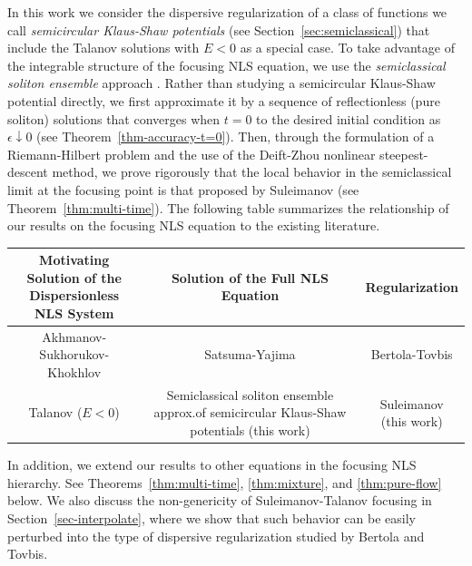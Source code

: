 \documentclass[12pt]{amsart}
\numberwithin{equation}{section}
\begin{document}
In this work we consider the dispersive regularization of a class of 
functions we call \emph{semicircular Klaus-Shaw potentials} (see 
Section~\ref{sec:semiclassical}) that include the Talanov solutions with $E<0$ as 
a special case.  To take advantage of the integrable structure of the 
focusing NLS equation, we use the \emph{semiclassical soliton ensemble} 
approach \cite{Kamvissis:2003}.  Rather than studying a semicircular 
Klaus-Shaw potential directly, we first approximate it by a sequence of 
reflectionless (pure soliton) solutions that converges when $t=0$ to the 
desired initial condition as $\epsilon\downarrow 0$ (see 
Theorem~\ref{thm-accuracy-t=0}).  Then, through the 
formulation of a Riemann-Hilbert problem and the use of the Deift-Zhou 
nonlinear steepest-descent method, we prove rigorously that the local behavior 
in the semiclassical limit at the focusing point is that proposed by 
Suleimanov (see Theorem~\ref{thm:multi-time}).  The following table 
summarizes the relationship of our results on the focusing NLS equation 
to the existing literature.  
\begin{center}
\begin{tabular}{|c|c|c|}
\hline
\parbox{0.4\linewidth}{\small\textbf{Motivating Solution of the \\Dispersionless NLS System}} &
\parbox{0.34\linewidth}{\small\textbf{Solution of the Full NLS \\Equation}} &
\parbox{0.19\linewidth}{\small\textbf{Regularization}}\\
\hline
\parbox{0.4\linewidth}{\small Akhmanov-Sukhorukov-Khokhlov \cite{AkhmanovSK66}} &
\parbox{0.34\linewidth}{\small Satsuma-Yajima \cite{SatsumaY74}} & 
\parbox{0.19\linewidth}{\small Bertola-Tovbis \cite{BertolaT13}}\\
\hline
\parbox{0.4\linewidth}{\small Talanov ($E<0$) \cite{Talanov65}} &
\parbox{0.34\linewidth}{\small Semiclassical soliton ensemble approx.\@ of semicircular Klaus-Shaw potentials (this work)} &
\parbox{0.19\linewidth}{\small Suleimanov \\(this work)}\\
\hline
\end{tabular}
\end{center}
In addition, we extend our results to other equations in the focusing NLS 
hierarchy.  See Theorems~\ref{thm:multi-time}, \ref{thm:mixture}, and 
\ref{thm:pure-flow} below.  We also discuss the non-genericity 
of Suleimanov-Talanov focusing in Section~\ref{sec-interpolate}, where we show 
that such behavior can be easily perturbed into the type of dispersive 
regularization studied by Bertola and Tovbis.  
\end{document}
